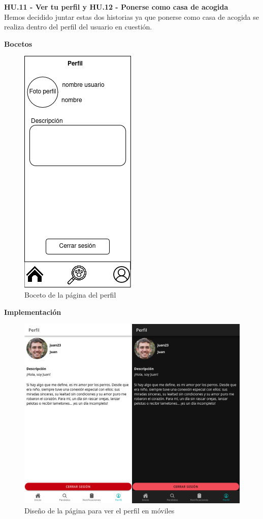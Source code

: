 \Large{\textbf{HU.11 - Ver tu perfil y HU.12 - Ponerse como casa de acogida}} \\

Hemos decidido juntar estas dos historias ya que ponerse como casa de acogida se realiza dentro del perfil del usuario en cuestión.

\textbf{Bocetos} \\
\begin{figure}[H]
	\centering
	\includegraphics[width=0.31\linewidth]{sprint 3//hu11-12/boceto.png}
	\caption{Boceto de la página del perfil}
\end{figure}

\textbf{Implementación}

\begin{figure} [H]
	\centering
	\includegraphics[width=1\linewidth]{sprint 3//hu11-12/implementacion.png}
	\caption{Diseño de la página para ver el perfil en móviles}
	\label{fig:impPerfil}
\end{figure}

